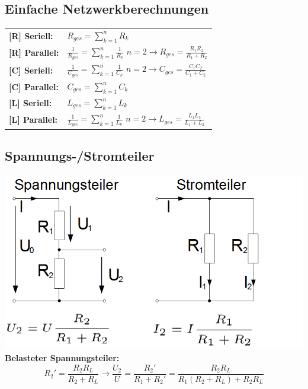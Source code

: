 \documentclass[a4paper, 6pt, landscape]{scrartcl}
\begin{document}
\begin{multicols*}{4}
	\subsection{Einfache Netzwerkberechnungen}
	\begin{tabular}{ll}
		\textbf{[R] Seriell:}  & $R_{ges}=\sum\limits_{k=1}^{n}{R_k}$                                                                           \\
		\textbf{[R] Parallel:} & $\frac{1}{R_{ges}}=\sum\limits_{k=1}^{n}{\frac{1}{R_k}}$ \quad $n=2\rightarrow R_{ges}=\frac{R_1R_2}{R_1+R_2}$ \\
		\textbf{[C] Seriell:}  & $\frac{1}{C_{ges}}=\sum\limits_{k=1}^{n}{\frac{1}{C_k}}$ \quad $n=2\rightarrow C_{ges}=\frac{C_1C_2}{C_1+C_2}$ \\
		\textbf{[C] Parallel:} & $C_{ges}=\sum\limits_{k=1}^{n}{C_k}$                                                                           \\
		\textbf{[L] Seriell:}  & $L_{ges}=\sum\limits_{k=1}^{n}{L_k}$                                                                           \\
		\textbf{[L] Parallel:} & $\frac{1}{L_{ges}}=\sum\limits_{k=1}^{n}{\frac{1}{L_k}}$ \quad $n=2\rightarrow L_{ges}=\frac{L_1L_2}{L_1+L_2}$
	\end{tabular}

	\subsection{Spannungs-/Stromteiler}
	\includegraphics[scale=0.24]{source/teiler.png}\\
	\textbf{Belasteter Spannungsteiler:}\\
	$$R_{2}'=\frac{R_2R_L}{R_2+R_L}\rightarrow \frac{U_2}{U}=\frac{R_{2}'}{R_1+R_{2}'}=\frac{R_2R_L}{R_1(R_2+R_L)+R_2R_L}$$


\end{multicols*}
\end{document}
